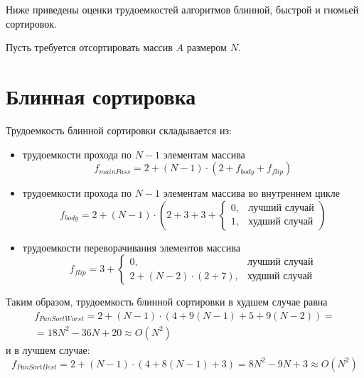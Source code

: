 Ниже приведены оценки трудоемкостей алгоритмов блинной, быстрой и гномьей сортировок.

Пусть требуется отсортировать массив $A$ размером $N$.

\section{Блинная сортировка}

Трудоемкость блинной сортировки складывается из:
\begin{itemize}
    \item трудоемкости прохода по $N - 1$ элементам массива
    \begin{equation}
        f_{mainPass} = 2 + (N - 1) \cdot (2 + f_{body} + f_{flip})
    \end{equation}
    \item трудоемкости прохода по $N - 1$ элементам массива во внутреннем цикле
    \begin{equation}
        f_{body} = 2 + (N - 1) \cdot \left (2 + 3 + 3 +
        \begin{cases}
            0, & \text{лучший случай} \\
            1, & \text{худший случай}
        \end{cases} \right )
    \end{equation}
    \item трудоемкости переворачивания элементов массива
    \begin{equation}
        f_{flip} = 3 + 
        \begin{cases}
            0, & \text{лучший случай} \\
            2 + (N - 2) \cdot (2 + 7), & \text{худший случай}
        \end{cases}
    \end{equation}
\end{itemize}

Таким образом, трудоемкость блинной сортировки в худшем случае равна
\begin{equation}
    \begin{gathered}
        f_{PanSortWorst} = 2 + (N - 1) \cdot (4 + 9(N - 1) + 5 + 9(N - 2)) = \\
        = 18N^2 - 36N + 20 \approx O(N^2)
    \end{gathered}
\end{equation}
и в лучшем случае:
\begin{equation}
        f_{PanSortBest} = 2 + (N - 1) \cdot (4 + 8(N - 1) + 3) = 8N^2 - 9N + 3 \approx O(N^2)
\end{equation}

